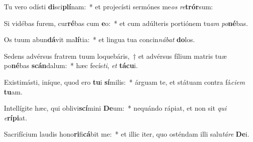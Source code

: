 \item Tu vero odísti \textbf{di}sci\textbf{plí}nam:~* et projecísti sermónes me\textit{os} \textit{re}\textbf{trór}sum:
\item Si vidébas furem, cur\textbf{ré}bas cum \textbf{e}o:~* et cum adúlteris portiónem tu\textit{am} \textit{po}\textbf{né}bas.
\item Os tuum abun\textbf{dá}vit ma\textbf{lí}tia:~* et lingua tua concin\textit{ná}\textit{bat} \textbf{do}los.
\item Sedens advérsus fratrem tuum loquebáris,~† et advérsus fílium matris tuæ po\textbf{né}bas \textbf{scán}dalum:~* hæc fecís\textit{ti}, \textit{et} \textbf{tá}\textbf{cu}i.
\item Existimásti, iníque, quod ero \textbf{tu}i \textbf{sí}milis:~* árguam te, et státuam contra fá\textit{ci}\textit{em} \textbf{tu}am.
\item Intellígite hæc, qui oblivi\textbf{scí}mini \textbf{De}um:~* nequándo rápiat, et non sit \textit{qui} \textit{e}\textbf{rí}\textbf{pi}at.
\item Sacrifícium laudis hono\textbf{ri}fi\textbf{cá}bit me:~* et illic iter, quo osténdam illi salu\textit{tá}\textit{re} \textbf{De}i.
